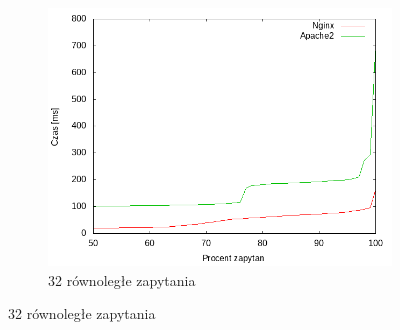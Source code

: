 \begin{figure}
\begin{subfigure}[h]{0.3\textwidth}
		\includegraphics[width=\textwidth]{testy/wybor_index_duzy_32.png}
		\caption{32 równoległe zapytania}
	\end{subfigure}


\end{figure}
